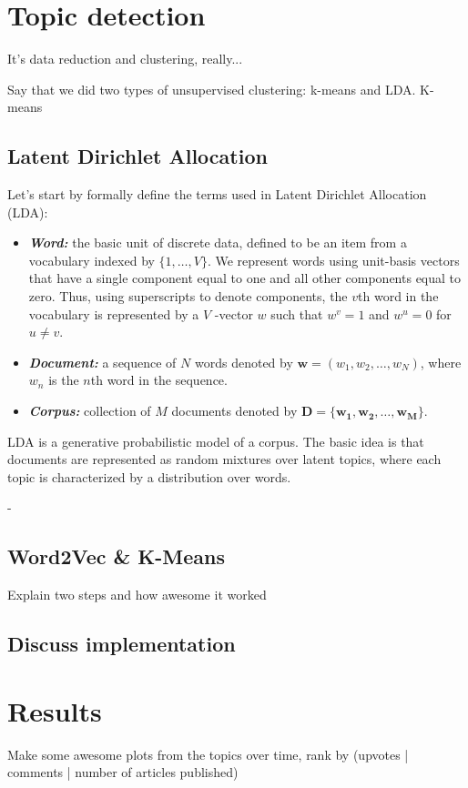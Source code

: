\section{Topic detection}
\label{sec:topic_detection}


It's data reduction and clustering, really...

Say that we did two types of unsupervised clustering: k-means and LDA. K-means

\subsection{Latent Dirichlet Allocation}
Let's start by formally define the terms used in Latent Dirichlet Allocation (LDA):

\begin{itemize} 
\item \textbf{\textit{Word:}} the basic unit of discrete data, defined to be an item from a vocabulary indexed by
$\{1, \dotsc, V\}$. We represent words using unit-basis vectors that have a single component equal to one and all other components equal to zero. Thus, using superscripts to denote components, the $v$th word in the vocabulary is represented by a $V$ -vector $w$ such that $w^v = 1$ and $w^u = 0$ for $u \neq v$.
\item \textbf{\textit{Document:}}  a sequence of $N$ words denoted by $\mathbf{w} = (w_1, w_2, \dotsc, w_N)$, where $w_n$ is the $n$th word in the sequence.
\item \textbf{\textit{Corpus:}} collection of $M$ documents denoted by $\mathbf{D = \{w_1,w_2, \dotsc, w_M\}}$.
\end{itemize}

LDA is a generative probabilistic model of a corpus. The basic idea is that documents are represented as random mixtures over latent topics, where each topic is characterized by a distribution over words.\cite{blei2003latent}

- 

\subsection{Word2Vec \& K-Means}
Explain two steps and how awesome it worked

\subsection{Discuss implementation}

\section{Results}
Make some awesome plots from the topics over time, rank by (upvotes | comments | number of articles published)

